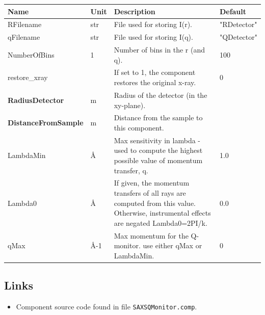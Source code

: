 \begin{longtable}{p{}p{}p{}p{}}
\toprule
\textbf{Name} & \textbf{Unit} & \textbf{Description} & \textbf{Default} \\
\midrule
\endhead
RFilename & str & File used for storing I(r). & "RDetector" \\
qFilename & str & File used for storing I(q). & "QDetector" \\
NumberOfBins & 1 & Number of bins in the r (and q). & 100 \\
restore\_xray &  & If set to 1, the component restores the original x-ray. & 0 \\
\textbf{RadiusDetector} & m & Radius of the detector (in the xy-plane). &  \\
\textbf{DistanceFromSample} & m & Distance from the sample to this component. &  \\
LambdaMin & \AA{} & Max sensitivity in lambda - used to compute the highest possible value of momentum transfer, q. & 1.0 \\
Lambda0 & \AA{} & If given, the momentum transfers of all rays are computed from this value. Otherwise, instrumental effects are negated Lambda0=2PI/k. & 0.0 \\
qMax & \AA{}-1 & Max momentum for the Q-monitor. use either qMax or LambdaMin. & 0 \\
\bottomrule
\end{longtable}

\subsection*{Links}
\begin{itemize}
  \item Component source code found in file \texttt{SAXSQMonitor.comp}.
\end{itemize}
